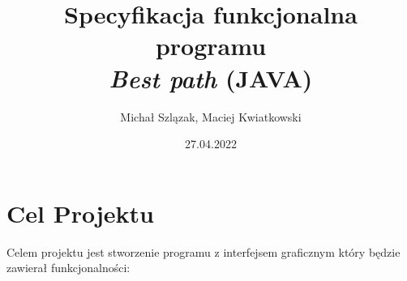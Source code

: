 \documentclass[12pt, a4paper]{article}
\begin{document}
\title{Specyfikacja funkcjonalna programu\\ \textit{Best path} (JAVA)}
\date{27.04.2022}
\author{Michał Szlązak, Maciej Kwiatkowski}
\maketitle
\tableofcontents
\thispagestyle{empty}
\cleardoublepage

\newpage

\setcounter{page}{1}

\section{Cel Projektu}
Celem projektu jest stworzenie programu z interfejsem graficznym który będzie zawierał funkcjonalności:
\end{document}
